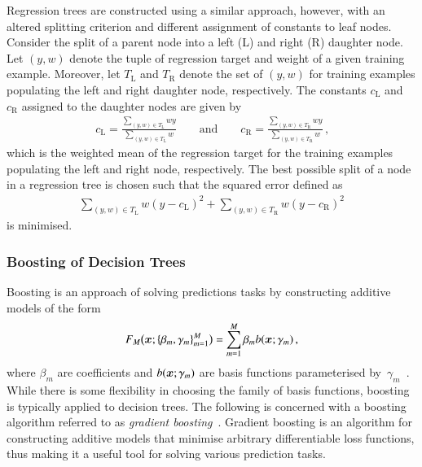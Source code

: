 Regression trees are constructed using a similar approach, however, with an
altered splitting criterion and different assignment of constants to leaf
nodes. Consider the split of a parent node into a left (L) and right (R)
daughter node. Let $(y, w)$ denote the tuple of regression target and weight of
a given training example. Moreover, let $T_{\text{L}}$ and $T_{\text{R}}$ denote
the set of $(y, w)$ for training examples populating the left and right daughter
node, respectively. The constants $c_{\text{L}}$ and $c_{\text{R}}$ assigned to
the daughter nodes are given by
\begin{align*}
  c_{\text{L}} = \frac{\sum_{(y, w) \in T_{\text{L}}} w y}{\sum_{(y, w) \in T_{\text{L}}} w} \qquad \text{and} \qquad c_{\text{R}} = \frac{\sum_{(y, w) \in T_{\text{R}}} w y}{\sum_{(y, w) \in T_{\text{R}}} w} \,\text{,}
\end{align*}
which is the weighted mean of the regression target for the training examples
populating the left and right node, respectively. The best possible split of a
node in a regression tree is chosen such that the squared error defined as
\begin{align*}
  \sum_{(y, w) \in T_{\text{L}}} w (y - c_{\text{L}})^2 + \sum_{(y, w) \in T_{\text{R}} } w (y - c_{\text{R}})^2
\end{align*}
is minimised.


\subsubsection{Boosting of Decision Trees}

Boosting is an approach of solving predictions tasks by constructing additive
models of the form
\begin{align*}
  F_{M}\bigl(\bm{x}; \{ \beta_m, \gamma_{m} \}_{m=1}^{M} \bigr) = \sum_{m = 1}^{M} \beta_m b(\bm{x}; \gamma_{m}) \,\text{,}
\end{align*}
where $\beta_m$ are coefficients and $b(\bm{x}; \gamma_{m})$ are basis
functions parameterised
by~$\gamma_{m}$~\cite{Friedman:2000,Friedman:2001wbq}. While there is some
flexibility in choosing the family of basis functions, boosting is typically
applied to decision trees.
The following is concerned with a boosting algorithm referred to as
\emph{gradient boosting}~\cite{Friedman:2001wbq}. Gradient boosting is an
algorithm for constructing additive models that minimise arbitrary
differentiable loss functions, thus making it a useful tool for solving various
prediction tasks.

